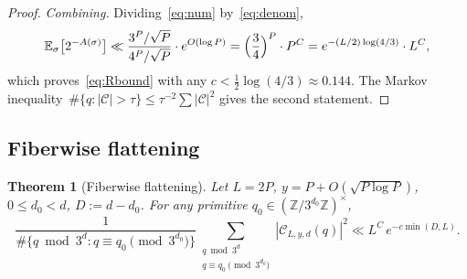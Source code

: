 \documentclass[11pt,a4paper]{amsart}
\theoremstyle{plain}
\newtheorem{theorem}{Theorem}[section]
\theoremstyle{definition}
\newcommand{\Z}{\mathbb{Z}}
\newcommand{\E}{\mathbb{E}}
\begin{document}
\begin{proof}
\emph{Combining.}
Dividing~\eqref{eq:num} by~\eqref{eq:denom},
$$
\E_\sigma\bigl[2^{-A(\sigma)}\bigr]
\ll \frac{3^P/\sqrt P}{4^P/\sqrt P}\cdot e^{O(\log P)}
=\Bigl(\frac{3}{4}\Bigr)^P\cdot P^{C}
=e^{-(L/2)\log(4/3)}\cdot L^{C},
$$
which proves~\eqref{eq:Rbound} with any $c<\tfrac12\log(4/3)\approx 0.144$.
The Markov inequality~$\#\{q:|\mathcal C|>\tau\}\le\tau^{-2}\sum|\mathcal C|^2$
gives the second statement.
\end{proof}

\subsection{Fiberwise flattening}
\begin{theorem}[Fiberwise flattening]\label{thm:T}
Let $L=2P$, $y=P+O(\sqrt{P\log P})$, $0\le d_0<d$, $D:=d-d_0$.
For any primitive $q_0\in(\Z/3^{d_0}\Z)^\times$,
\begin{equation}\label{eq:Tbound}
\frac{1}{\#\{q\bmod 3^d:q\equiv q_0\!\!\pmod{3^{d_0}}\}}
\sum_{\substack{q\bmod 3^d\\q\equiv q_0\!\!\pmod{3^{d_0}}}}
|\mathcal C_{L,y,d}(q)|^2
\ll L^C\,e^{-c\min(D,L)}.
\end{equation}
\end{theorem}
\end{document}
